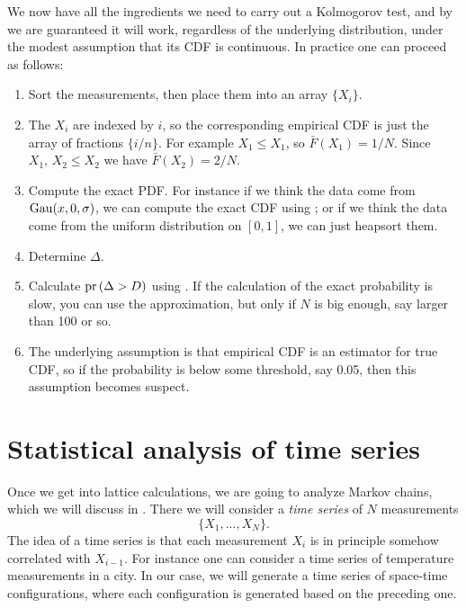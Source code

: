 We now have all the ingredients we need to carry out a Kolmogorov test,
and by  we are guaranteed it will work, regardless
of the underlying distribution, under the modest assumption that its
CDF is continuous. In practice one can proceed as follows:
\begin{enumerate}
  \item Sort the measurements, then place them into an array $\{X_i\}$.
  \item The $X_i$ are indexed by $i$, so the corresponding empirical CDF 
        is just the array of fractions $\{i/n\}$. For example $X_1\leq X_1$, 
        so $\bar{F}(X_1)=1/N$. Since $X_1,\,X_2\leq X_2$ we have 
        $\bar{F}(X_2)=2/N$.
  \item Compute the exact PDF. For instance if we think the
        data come from $\operatorname{Gau}(x,0,\sigma)$, we can compute the exact CDF
        using ; or if we think the data come from the 
        uniform distribution on $[0,1]$, we can just heapsort them.
  \item Determine $\Delta$.
  \item Calculate $\pr{\Delta>D}$ using .
        If the calculation of the exact probability is slow, you can
        use the approximation, but only if $N$ is big enough, say larger
        than 100 or so.
  \item The underlying assumption is that empirical CDF is an estimator
        for true CDF, so if the probability is below some threshold,
        say 0.05, then this assumption becomes suspect. 
\end{enumerate}

\section{Statistical analysis of time series}\label{sec:timeSeries}

Once we get into lattice calculations, we are going to analyze
Markov chains, which we will discuss in . There
we will consider a {\it time series} of $N$
measurements
\begin{equation}
\{X_1, ..., X_N\}. 
\end{equation}
The idea of a time series is that each measurement
$X_i$ is in principle somehow correlated with $X_{i-1}$.
For instance one can consider a time series of temperature
measurements in a city. In our case, we will generate a time
series of space-time configurations, where each configuration
is generated based on the preceding one.

